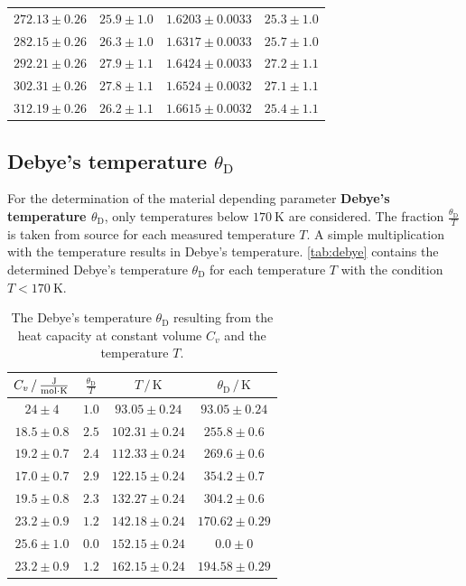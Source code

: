 \begin{table}
\begin{tabular}{c c c c}
        $272.13\pm0.26$ & $25.9\pm1.0$ & $1.6203\pm0.0033$ & $25.3\pm1.0$ \\
        $282.15\pm0.26$ & $26.3\pm1.0$ & $1.6317\pm0.0033$ & $25.7\pm1.0$ \\
        $292.21\pm0.26$ & $27.9\pm1.1$ & $1.6424\pm0.0033$ & $27.2\pm1.1$ \\
        $302.31\pm0.26$ & $27.8\pm1.1$ & $1.6524\pm0.0032$ & $27.1\pm1.1$ \\
        $312.19\pm0.26$ & $26.2\pm1.1$ & $1.6615\pm0.0032$ & $25.4\pm1.1$ \\
        \bottomrule
    \end{tabular}
\end{table}
\FloatBarrier

\subsection{Debye's temperature \texorpdfstring{$\theta_\text{D}$}{theta}}
For the determination of the material depending parameter \textbf{Debye's temperature $\theta_\text{D}$}, only temperatures below $\qty{170}{\kelvin}$ are considered.
The fraction $\frac{\theta_\text{D}}{T}$ is taken from source \cite{V47} for each measured temperature $T$.
A simple multiplication with the temperature results in Debye's temperature.
\autoref{tab:debye} contains the determined Debye's temperature $\theta_\text{D}$ for each temperature $T$ with the condition $T < \qty{170}{\kelvin}$. 
\begin{table}
    \centering
    \caption{The Debye's temperature $\theta_\text{D}$ resulting from the heat capacity at constant volume $C_v$ and the temperature $T$.}
    \label{tab:debye}
    \begin{tabular}{c c c c}
        \toprule
        $C_v \,/\, \unit{\frac{\joule}{\mol \cdot \kelvin}}$ & $\frac{\theta_\text{D}}{T}$ & $T \,/\, \unit{\kelvin}$ & $\theta_\text{D} \,/\, \unit{\kelvin}$ \\
        \midrule
        $24\pm4$ & $1.0$ & $93.05\pm0.24$ & $93.05\pm0.24$ \\
        $18.5\pm0.8$ & $2.5$ & $102.31\pm0.24$ & $255.8\pm0.6$ \\
        $19.2\pm0.7$ & $2.4$ & $112.33\pm0.24$ & $269.6\pm0.6$ \\
        $17.0\pm0.7$ & $2.9$ & $122.15\pm0.24$ & $354.2\pm0.7$ \\
        $19.5\pm0.8$ & $2.3$ & $132.27\pm0.24$ & $304.2\pm0.6$ \\
        $23.2\pm0.9$ & $1.2$ & $142.18\pm0.24$ & $170.62\pm0.29$ \\
        $25.6\pm1.0$ & $0.0$ & $152.15\pm0.24$ & $0.0\pm0$ \\
        $23.2\pm0.9$ & $1.2$ & $162.15\pm0.24$ & $194.58\pm0.29$ \\
        \bottomrule
    \end{tabular}
\end{table}

